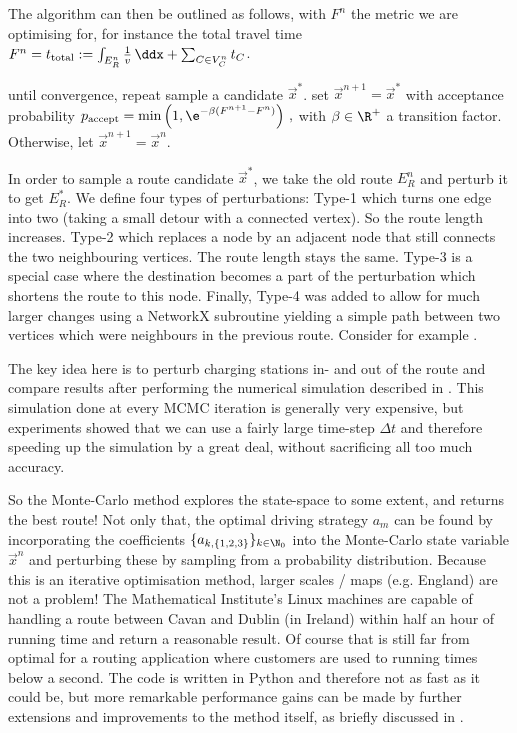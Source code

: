 \documentclass{prettytex/ox/mmsc-special-topic}
\begin{document}
  The algorithm can then be outlined as follows, with $F^{n}$ the metric we are optimising for, for instance the total travel time $F^n = t_{\rm total} := \int_{E_R^n} \frac{1}{v} \,\ddx + \sum_{C \in V_C^n} t_C$.
  \begin{algorithm}[language=pseudo,caption={\centering The Metropolis-Hastings algorithm \parencite{metropolis, hastings}},basicstyle=\footnotesize]
until convergence, repeat
  sample a candidate $\vec{x}^*$.
  set $\vec{x}^{n+1} = \vec{x}^*$ with acceptance probability
    $p_{\rm accept} = \min\left(1, \e^{-\beta (F^{n+1} - F^n)}\right)\,,$ with $\beta \in \R^+$ a transition factor.
  Otherwise, let $\vec{x}^{n+1} = \vec{x}^{n}$.
  \end{algorithm}

  In order to sample a route candidate $\vec{x}^*$, we take the old route $E_R^n$ and perturb it to get $E_R^*$.
  We define four types of perturbations: Type-1 which turns one edge into two (taking a small detour with a connected vertex). So the route length increases.
  Type-2 which replaces a node by an adjacent node that still connects the two neighbouring vertices. The route length stays the same.
  Type-3 is a special case where the destination becomes a part of the perturbation which shortens the route to this node.
  Finally, Type-4 was added to allow for much larger changes using a NetworkX subroutine yielding a simple path between two vertices which were neighbours in the previous route. Consider for example .

  The key idea here is to perturb charging stations in- and out of the route and compare results after performing the numerical simulation described in .
  This simulation done at every MCMC iteration is generally very expensive, but experiments showed that we can use a fairly large time-step $\Delta t$ and therefore speeding up the simulation by a great deal, without sacrificing all too much accuracy.

  So the Monte-Carlo method explores the state-space to some extent, and returns the best route!
  Not only that, the optimal driving strategy $a_m$ can be found by incorporating the coefficients $\{a_{k,\{1,2,3\}}\}_{k\in\N_0}$ into the Monte-Carlo state variable $\vec{x}^{n}$ and perturbing these by sampling from a probability distribution.
  Because this is an iterative optimisation method, larger scales / maps (e.g. England) are not a problem! The Mathematical Institute's Linux machines are capable of handling a route between Cavan and Dublin (in Ireland) within half an hour of running time and return a reasonable result.
  Of course that is still far from optimal for a routing application where customers are used to running times below a second.
  The code is written in Python and therefore not as fast as it could be, but more remarkable performance gains can be made by further extensions and improvements to the method itself, as briefly discussed in .
\end{document}
